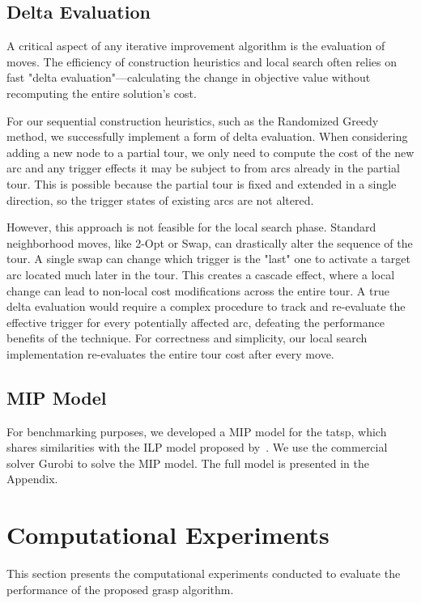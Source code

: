 \documentclass[twocolumn, switch]{article} %
\begin{document}
\subsection{Delta Evaluation}
A critical aspect of any iterative improvement algorithm is the evaluation of moves. The efficiency of construction heuristics and local search often relies on fast "delta evaluation"—calculating the change in objective value without recomputing the entire solution's cost.

For our sequential construction heuristics, such as the Randomized Greedy method, we successfully implement a form of delta evaluation. When considering adding a new node to a partial tour, we only need to compute the cost of the new arc and any trigger effects it may be subject to from arcs already in the partial tour. This is possible because the partial tour is fixed and extended in a single direction, so the trigger states of existing arcs are not altered.

However, this approach is not feasible for the local search phase. Standard neighborhood moves, like 2-Opt or Swap, can drastically alter the sequence of the tour. A single swap can change which trigger is the "last" one to activate a target arc located much later in the tour. This creates a cascade effect, where a local change can lead to non-local cost modifications across the entire tour. A true delta evaluation would require a complex procedure to track and re-evaluate the effective trigger for every potentially affected arc, defeating the performance benefits of the technique. For correctness and simplicity, our local search implementation re-evaluates the entire tour cost after every move.

\subsection{MIP Model}
For benchmarking purposes, we developed a MIP model for the \gls{tatsp}, which shares similarities with the ILP model proposed by~\citet{Cerrone}. We use the commercial solver Gurobi \cite{gurobi}to solve the MIP model.
The full model is presented in the Appendix.


\section{Computational Experiments}
This section presents the computational experiments conducted to evaluate the performance of the proposed \gls{grasp} algorithm.
\end{document}
